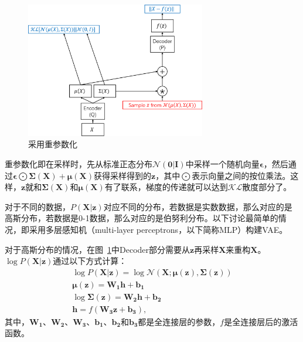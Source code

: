 \begin{figure}[h]
  \centering
  \includegraphics[width=0.7\textwidth]{reparam.png}
  \caption{采用重参数化}
  \label{fig:reparam}
\end{figure}
重参数化即在采样时，先从标准正态分布$\mathcal N(\bm 0|\bm I)$中采样一个随机向量$\bm \epsilon$，然后通过$\bm \epsilon \bigodot \bm \Sigma(\bm X) + \bm \mu (\bm X)$获得采样得到的$\bm z$，其中$\bigodot$表示向量之间的按位乘法。这样，$\bm z$就和$\bm \Sigma(\bm X)$和$\bm \mu (\bm X)$有了联系，梯度的传递就可以达到$\mathcal{KL}$散度部分了。\par

对于不同的数据，$P(\bm X|\bm z)$对应不同的分布，若数据是实数数据，那么对应的是高斯分布，若数据是0-1数据，那么对应的是伯努利分布。以下讨论最简单的情况，即采用多层感知机（multi-layer perceptrons，以下简称MLP）构建VAE。\par

对于高斯分布的情况，在图~\ref{fig:reparam}中Decoder部分需要从$\bm z$再采样$\bm X$来重构$\bm X$。$\log P(\bm X|\bm z)$通过以下方式计算：
\begin{equation}
  \begin{gathered}
  \label{eq:gaussian}
\log P(\bm X|\bm z) = \log \mathcal N(\bm X; \bm \mu(\bm z), \bm \Sigma(\bm z)) \\
\bm \mu(\bm z) = \bm {W_1}\bm h + \bm {b_1} \\
\log \bm \Sigma(\bm z) = \bm {W_2}\bm h + \bm {b_2} \\
\bm h = f(\bm {W_3}\bm z + \bm {b_3}),
  \end{gathered}
\end{equation}
其中，$\bm {W_1}$、$\bm {W_2}$、$\bm {W_3}$、$\bm {b_1}$、$\bm {b_2}$和$\bm {b_3}$都是全连接层的参数，$f$是全连接层后的激活函数。\par

